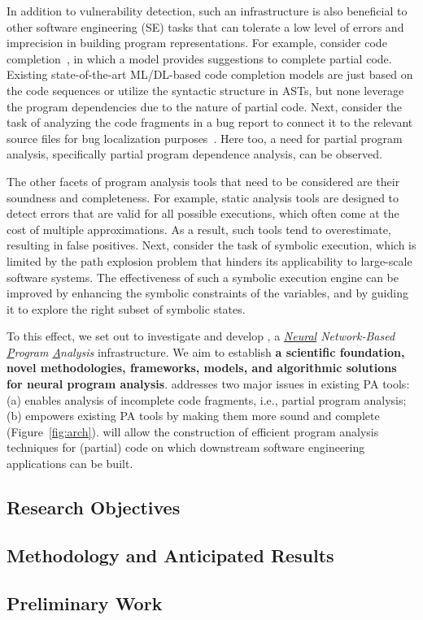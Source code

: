 In addition to vulnerability detection, such an 
infrastructure
is also beneficial to other software engineering (SE) tasks that can tolerate a low level of errors and imprecision in building program representations. For example, consider code completion~\cite{codefill-icse22,facebook-icse21}, in which a model provides suggestions to complete partial code. Existing state-of-the-art ML/DL-based code completion models are just based on the code sequences or utilize the syntactic structure in ASTs, but none leverage the program dependencies due to the nature of partial code. Next, consider the task of analyzing the code fragments in a bug report to connect it to the relevant source files for bug localization purposes~\cite{euler-fse19,icpc17}. Here too, a need for partial program analysis, specifically partial program dependence analysis, can be observed.

The other facets of program analysis tools that need to be considered are their soundness and completeness. For example, static analysis tools are designed to detect errors that are valid for all possible executions, which often come at the cost of multiple approximations. As a result, such tools tend to overestimate, resulting in false positives. Next, consider the task of symbolic execution, which is limited by the path explosion problem that hinders its applicability to large-scale software systems. The effectiveness of such a symbolic execution engine can be improved by enhancing the symbolic constraints of the variables, and by guiding it to explore the right subset of symbolic states. 

To this effect, we set out to investigate and develop {\tool}, a {\em \underline{Neural} Network-Based \underline{P}rogram \underline{A}nalysis} infrastructure. We aim to establish {\bf a scientific foundation, novel methodologies, frameworks, models, and algorithmic solutions for neural program analysis}. {\tool} addresses two major issues in existing PA tools: (a) enables analysis of incomplete code fragments, i.e., partial program analysis; (b) empowers existing PA tools by making them more sound and complete (Figure~\ref{fig:arch}). {\tool} will allow the construction of efficient program analysis techniques for (partial) code on which downstream software engineering applications can be built.

\subsection{Research Objectives}

\subsection{Methodology and Anticipated Results}


\subsection{Preliminary Work}





